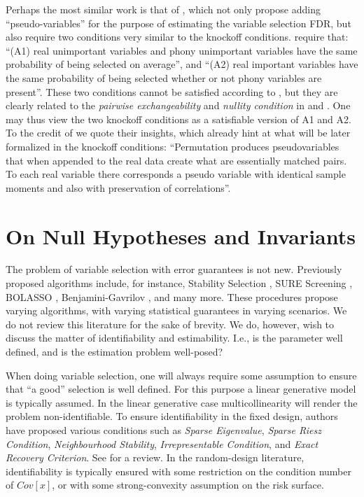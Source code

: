 \documentclass[article,lineno]{biometrika}
\begin{document}
Perhaps the most similar work is that of \cite{WuControllingVariableSelection2007}, which not only propose adding ``pseudo-variables'' for the purpose of estimating the variable selection FDR, but also require two conditions very similar to the knockoff conditions.
\cite{WuControllingVariableSelection2007} require that:
``(A1) real unimportant variables and phony unimportant variables have the same probability of being selected on average'', and
``(A2) real important variables have the same probability of being selected whether or not phony variables are present''.
These two conditions cannot be satisfied according to \cite{WuControllingVariableSelection2007}, but they are clearly related to the \emph{pairwise exchangeability} and \emph{nullity condition} in \cite{SesiaGenehuntinghidden} and \cite{CandesPanninggoldmodelX2018}.
One may thus view the two knockoff conditions as a satisfiable version of A1 and A2.
To the credit of \cite{WuControllingVariableSelection2007} we quote their insights, which already hint at what will be later formalized in the knockoff conditions:
``Permutation produces pseudovariables that when appended to the real data create what
are essentially matched pairs. To each real variable there corresponds a pseudo variable with identical sample moments and also with preservation of correlations''.



\section{On Null Hypotheses and Invariants}
The problem of variable selection with error guarantees is not new.
Previously proposed algorithms include, for instance, Stability Selection \citep{MeinshausenStabilityselection2010}, SURE Screening \citep{fan2008sure}, BOLASSO \citep{bach2008bolasso}, Benjamini-Gavrilov \citep{Benjaminisimpleforwardselection2009}, and many more.
These procedures propose varying algorithms, with varying statistical guarantees in varying scenarios.
We do not review this literature for the sake of brevity.
We do, however, wish to discuss the matter of identifiability and estimability.
I.e., is the parameter well defined, and is the estimation problem well-posed?

When doing variable selection, one will always require some assumption to ensure that ``a good'' selection is well defined.
For this purpose a linear generative model is typically assumed.
In the linear generative case multicollinearity will render the problem non-identifiable.
To ensure identifiability in the fixed design, authors have proposed various conditions such as \emph{Sparse Eigenvalue}, \emph{Sparse Riesz Condition}, \emph{Neighbourhood Stability}, \emph{Irrepresentable Condition}, and \emph{Exact Recovery Criterion}.
See \citet[Sec 3.1.1]{MeinshausenStabilityselection2010} for a review.
In the random-design literature, identifiability is typically ensured with some restriction on the condition number of $Cov[x]$, or with some strong-convexity assumption on the risk surface.
\end{document}
